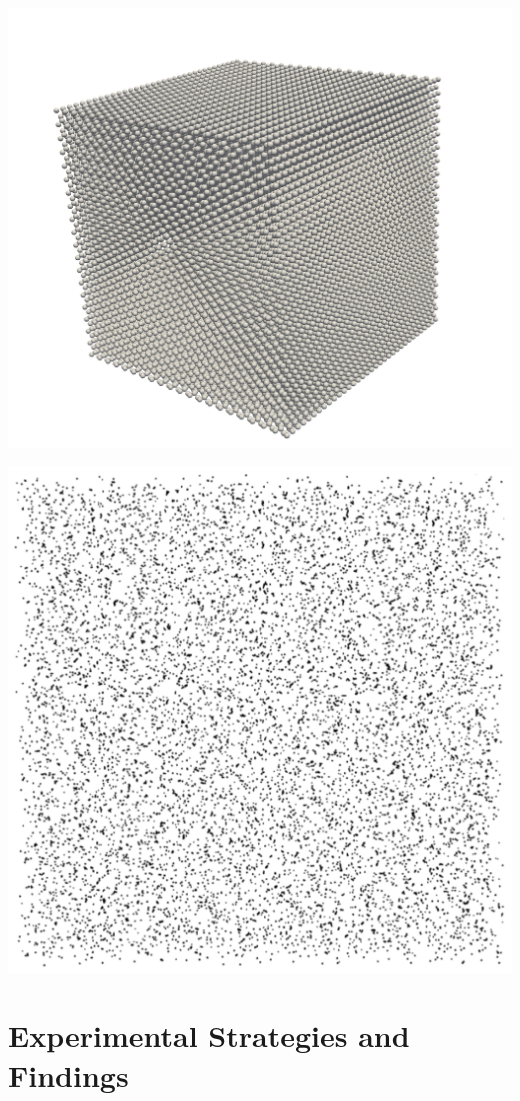 \vspace{1em} %

\noindent
\begin{minipage}[t]{0.5\textwidth} %
    \centering
    \includegraphics[width=0.5\linewidth]{imgs/constCube.png} %
    \label{fig:conc}
\end{minipage}%
\begin{minipage}[t]{0.5\textwidth} %
    \centering
    \includegraphics[width=0.5\linewidth]{imgs/spinodalDecomp.png} %
    \label{fig:equilibration}
\end{minipage}
\vspace{1em} 
\vspace{1em} 
\vspace{1em} 


\section{Experimental Strategies and Findings}


